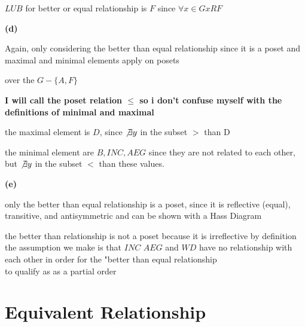 \documentclass[12pts,A4]{article}
\begin{document}
\begin{flushleft}
    $LUB$ for better or equal relationship is $F$ since $\forall x \in G xRF$

    \textbf{(d)}
    
    Again, only considering the better than equal relationship since it is a poset and maximal and minimal elements apply on posets

    over the $G - \{A, F\} $ 

    \textbf{I will call the poset relation $\leq$ so i don't confuse myself with the definitions of minimal and maximal}
    
    the maximal element is $D$, since $\not\exists y$ in the subset $>$ than D

    the minimal element are $B, INC, AEG$ since they are not related to each other, but $\not\exists y$ in the subset $<$ than these values.
    
    \bigskip

    \bigskip

    \textbf{(e)}

    only the better than equal relationship is a poset, since it is reflective (equal), transitive, and antisymmetric and can be shown with a Hass Diagram

    the better than relationship is not a poset because it is irreflective by definition\\
    \bigskip
    the assumption we make is that $INC$ $AEG$ and $WD$ have no relationship with each other in order for the "better than equal relationship\\
    to qualify as as a partial order
    
\end{flushleft}

\section{Equivalent Relationship}
\end{document}
